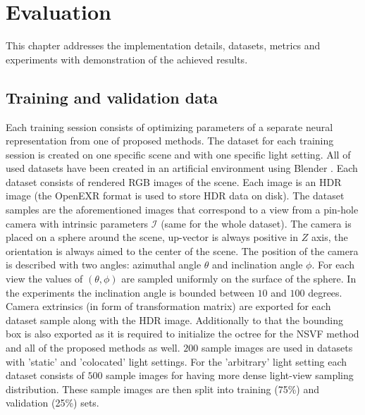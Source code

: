 
\chapter{Evaluation}
\label{chap:evaluation}

This chapter addresses the implementation details,
datasets, metrics and experiments with demonstration of the achieved results.



\section{Training and validation data}
\label{sec:datasets}

Each training session consists of optimizing parameters of a separate neural representation from one of proposed methods.
The dataset for each training session is created on one specific scene and with one specific light setting.
All of used datasets have been created in an artificial environment using Blender \cite{blender}.
Each dataset consists of rendered RGB images of the scene.
Each image is an HDR image (the OpenEXR \cite{openexr} format is used to store HDR data on disk).
The dataset samples are the aforementioned images
that correspond to a view from a pin-hole camera with intrinsic parameters $\mathcal{I}$ (same for the whole dataset).
The camera is placed on a sphere around the scene,
up-vector is always positive in $Z$ axis,
the orientation is always aimed to the center of the scene.
The position of the camera is described with two angles: azimuthal angle $\theta$ and inclination angle $\phi$.
For each view the values of $(\theta, \phi)$ are sampled uniformly on the surface of the sphere.
In the experiments the inclination angle is bounded between $10$ and $100$ degrees.
Camera extrinsics (in form of transformation matrix) are exported for each dataset sample along with the HDR image.
Additionally to that the bounding box is also exported as it is required
to initialize the octree for the NSVF method and all of the proposed methods as well.
$200$ sample images are used in datasets with 'static' and 'colocated' light settings.
For the 'arbitrary' light setting each dataset consists of $500$ sample images
for having more dense light-view sampling distribution.
These sample images are then split into training (75\%) and validation (25\%) sets.


